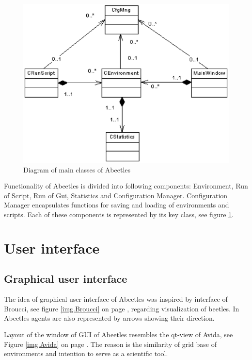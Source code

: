 \documentclass[a4paper,12pt]{report}
\begin{document}
\begin{figure}
\begin{center}
  \includegraphics [scale=0.8]{images/ComponentModel.eps} %
  \caption{Diagram of main classes of Abeetles}
  \label{img.ComponentModel}
\end{center}
\end{figure}

Functionality of Abeetles is divided into following components: Environment, Run of Script, Run of Gui, Statistics and Configuration Manager. Configuration Manager encapsulates functions for saving and loading of environments and scripts. Each of these components is  represented by its key class, see figure \ref {img.ComponentModel}.

\section {User interface}
\subsection {Graphical user interface}
The idea of graphical user interface of Abeetles was inspired by interface of Broucci, see figure \ref{img.Broucci} on page \pageref{img.Broucci}, regarding visualization of beetles. In Abeetles agents are also represented by arrows showing their direction. %

Layout of the window of GUI of Abeetles resembles the qt-view of Avida,  see Figure \ref{img.Avida} on page \pageref{img.Avida} . The reason is the similarity of grid base of environments and intention to serve as a scientific tool.
\end{document}
